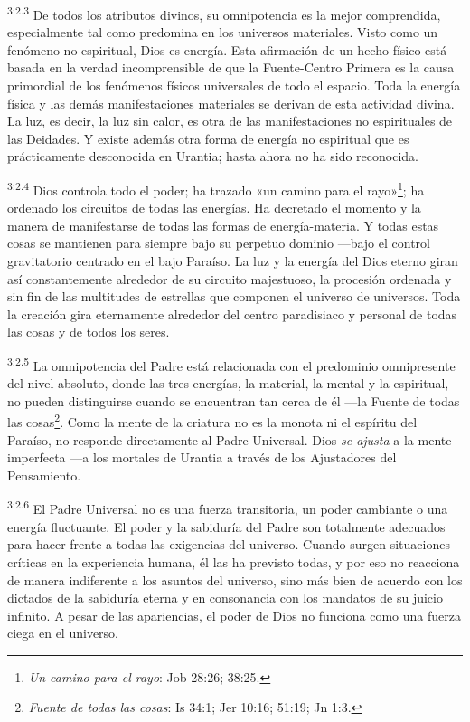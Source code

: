 \par
\textsuperscript{3:2.3} De todos los atributos divinos, su omnipotencia es la mejor comprendida, especialmente tal como predomina en los universos materiales. Visto como un fenómeno no espiritual, Dios es energía. Esta afirmación de un hecho físico está basada en la verdad incomprensible de que la Fuente-Centro Primera es la causa primordial de los fenómenos físicos universales de todo el espacio. Toda la energía física y las demás manifestaciones materiales se derivan de esta actividad divina. La luz, es decir, la luz sin calor, es otra de las manifestaciones no espirituales de las Deidades. Y existe además otra forma de energía no espiritual que es prácticamente desconocida en Urantia; hasta ahora no ha sido reconocida.

\par
\textsuperscript{3:2.4} Dios controla todo el poder; ha trazado «un camino para el rayo»\footnote{\textit{Un camino para el rayo}: Job 28:26; 38:25.}; ha ordenado los circuitos de todas las energías. Ha decretado el momento y la manera de manifestarse de todas las formas de energía-materia. Y todas estas cosas se mantienen para siempre bajo su perpetuo dominio ---bajo el control gravitatorio centrado en el bajo Paraíso. La luz y la energía del Dios eterno giran así constantemente alrededor de su circuito majestuoso, la procesión ordenada y sin fin de las multitudes de estrellas que componen el universo de universos. Toda la creación gira eternamente alrededor del centro paradisiaco y personal de todas las cosas y de todos los seres.

\par
\textsuperscript{3:2.5} La omnipotencia del Padre está relacionada con el predominio omnipresente del nivel absoluto, donde las tres energías, la material, la mental y la espiritual, no pueden distinguirse cuando se encuentran tan cerca de él ---la Fuente de todas las cosas\footnote{\textit{Fuente de todas las cosas}: Is 34:1; Jer 10:16; 51:19; Jn 1:3.}. Como la mente de la criatura no es la monota ni el espíritu del Paraíso, no responde directamente al Padre Universal. Dios \textit{se ajusta} a la mente imperfecta ---a los mortales de Urantia a través de los Ajustadores del Pensamiento.

\par
\textsuperscript{3:2.6} El Padre Universal no es una fuerza transitoria, un poder cambiante o una energía fluctuante. El poder y la sabiduría del Padre son totalmente adecuados para hacer frente a todas las exigencias del universo. Cuando surgen situaciones críticas en la experiencia humana, él las ha previsto todas, y por eso no reacciona de manera indiferente a los asuntos del universo, sino más bien de acuerdo con los dictados de la sabiduría eterna y en consonancia con los mandatos de su juicio infinito. A pesar de las apariencias, el poder de Dios no funciona como una fuerza ciega en el universo.

